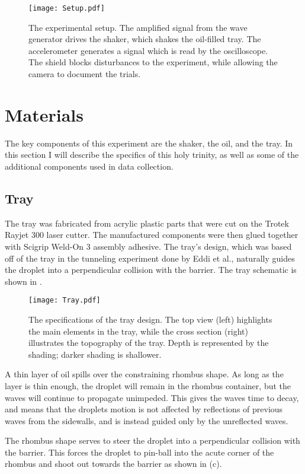   
    
\begin{figure}[h!]
	\centering
	\texttt{[image: Setup.pdf]}
	\caption{The experimental setup. The amplified signal from the wave generator drives the shaker, which shakes the oil-filled tray. The accelerometer generates a signal which is read by the oscilloscope. The shield blocks disturbances to the experiment, while allowing the camera to document the trials.}
	\label{setup}
\end{figure}

\section{Materials}
The key components of this experiment are the shaker, the oil, and the tray. In this section I will describe the specifics of this holy trinity, as well as some of the additional components used in data collection. 

\subsection{Tray}
The tray was fabricated from acrylic plastic parts that were cut on the Trotek Rayjet 300 laser cutter. The manufactured components were then glued together with Scigrip Weld-On 3 assembly adhesive. The tray's design, which was based off of the tray in the tunneling experiment done by Eddi et al., naturally guides the droplet into a perpendicular collision with the barrier. The tray schematic is shown in . 

\begin{figure}[h!]
	\centering
	\texttt{[image: Tray.pdf]}
	\caption{The specifications of the tray design. The top view (left) highlights the main elements in the tray, while the cross section (right) illustrates the topography of the tray. Depth is represented by the shading; darker shading is shallower.}
	\label{tray}
\end{figure}

A thin layer of oil spills over the constraining rhombus shape. As long as the layer is thin enough, the droplet will remain in the rhombus container, but the waves will continue to propagate unimpeded. This gives the waves time to decay, and means that the droplets motion is not affected by reflections of previous waves from the sidewalls, and is instead guided only by the unreflected waves. 

The rhombus shape serves to steer the droplet into a perpendicular collision with the barrier. This forces the droplet to pin-ball into the acute corner of the rhombus and shoot out towards the barrier as shown in (c).

